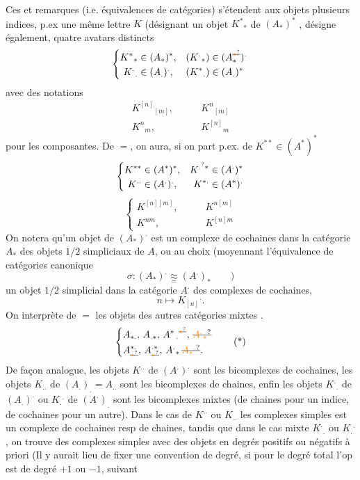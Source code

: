 Ces   et remarques (i.e. équivalences de catégories) s'étendent aux objets   plusieurs indices, p.ex  une même lettre $K$ (désignant  un objet $K^*{}_*$ de $(A_*)^*$ , désigne également,  quatre avatars distincts
\[
 \left\{\begin{aligned}
 K^*{}_*&\in(A_*)^*, & (K^{.}{}_*)&\in(A_*^{\deleted{\unsure{*}}})^{.}\\
 K^{.}{}_.&\in(A_.)^{.}, &(K^*{}_.)&\in(A_.)^*
 \end{aligned}\right.
\]
avec des notations
\[
 \begin{aligned}
 K^{[n]}{}_{[m]},&\qquad K^n{}_{[m]}\\
 K^n{}_{m},&\qquad K^{[n]}{}_{m}
 \end{aligned}
\]
pour les composantes. De $=$, on aura, si on part p.ex. de $K^{**}\in(A^*)^*$
\[
 \left\{\begin{aligned}
 K^{**}&\in(A^*)^*, &K^{\unsure{.}*}&\in(A^{.})^*\\
 K^{..}&\in(A^{.})^{.}, &K^{*.}&\in(A^*)^{.}
 \end{aligned}\right.
\]
\[
 \left\{\begin{aligned}
 K^{[n][m]},&\qquad K^{n[m]}\\
 K^{nm},&\qquad K^{[n]m}
 \end{aligned}\right.
\]
On notera qu'un objet de $(A_*)^{.}$ est un complexe de cochaines  dans la catégorie $A_*$ des objets $1/2$ simpliciaux de $A$,
ou au choix (moyennant  l'équivalence de catégories canonique
\[
 \sigma:(A_*)^{.}\underset{=}{\approx}(A^{.})_*\qquad)
\]
un objet $1/2$ simplicial dans la catégorie $A^{.}$ des complexes de cochaines, 
\[
 n\longmapsto K_{[n]}{}^{.}.
\]
On interprète de $=$ les objets des autres catégories mixtes .
\[
 \left\{\begin{aligned}
 &A_{*.},\, A_{.*},\, A^*{}_{\,.}{}^{\deleted{\unsure{*}}},\,\deleted{\unsure{A^{.}{}_*}}\\
 &A^{*.}_{\deleted{\unsure{*}}},\, A^{.*}_{\deleted{\unsure{*}}},\, A^{.}{}_*\,\deleted{\unsure{A_*{}^{.}}}.
 \end{aligned}\right.\tag*{(*)}
\]
De façon analogue, les objets $K^{..}$ de $(A^{.})^{.}$ sont les bicomplexes de cochaines, les objets $K_{..}$ de $(A_.)_.=A_{..}$ sont les bicomplexes de chaines, enfin les objets $K^{.}{}_.$ de $(A_.)^{.}$ ou $K_.{}^{.}$ de $(A^{.})_.$ sont les bicomplexes mixtes  (de chaines pour un indice, de cochaines pour un autre). Dans le cas de $K^{..}$ ou $K_{..}$ les complexes simples  est un complexe de cochaines resp de chaines, tandis que dans le cas mixte $K^{.}{}_.$ ou $K_.{}^{.}$, on trouve des complexes simples avec des objets en degrés positifs ou négatifs à priori (Il y aurait lieu de fixer une convention de degré, si pour le degré total l'op  est de degré $+1$ ou $-1$, suivant
